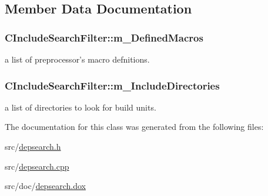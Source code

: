 \subsection{Member Data Documentation}
\hypertarget{classCIncludeSearchFilter_af5c1083b429ed970c5ae8bce126e726d}{
\subsubsection[{m\-\_\-\-Defined\-Macros}]{\setlength{\rightskip}{0pt plus 5cm}C\-Include\-Search\-Filter\-::m\-\_\-\-Defined\-Macros\hspace{0.3cm}{\ttfamily [protected]}}}\label{classCIncludeSearchFilter_af5c1083b429ed970c5ae8bce126e726d}


a list of preprocessor's macro defnitions. 

\hypertarget{classCIncludeSearchFilter_a888266f23bb4769ba0c931e285c04015}{
\subsubsection[{m\-\_\-\-Include\-Directories}]{\setlength{\rightskip}{0pt plus 5cm}C\-Include\-Search\-Filter\-::m\-\_\-\-Include\-Directories\hspace{0.3cm}{\ttfamily [protected]}}}\label{classCIncludeSearchFilter_a888266f23bb4769ba0c931e285c04015}


a list of directories to look for build units. 



The documentation for this class was generated from the following files\-:\begin{DoxyCompactItemize}
\item 
src/\hyperlink{depsearch_8h}{depsearch.\-h}\item 
src/\hyperlink{depsearch_8cpp}{depsearch.\-cpp}\item 
src/doc/\hyperlink{depsearch_8dox}{depsearch.\-dox}\end{DoxyCompactItemize}

